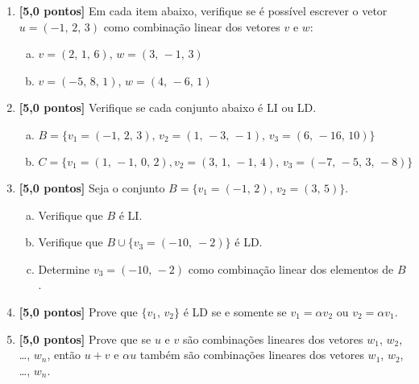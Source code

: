 \documentclass[12pt,a4paper]{article}
\begin{document}
\begin{enumerate}

  \item \textbf{[5,0 pontos]} Em cada item abaixo, verifique se é possível
  escrever o vetor $u = (-1,\, 2,\, 3)$ como combinação linear dos vetores 
  $v$ e $w$:
    \begin{enumerate}[(a)]
      \item $v = (2,\, 1,\, 6)$,  $w = (3,\, -1,\, 3)$
      \item $v = (-5,\, 8,\, 1)$, $w = (4,\, -6,\, 1)$
    \end{enumerate}
  
  \item \textbf{[5,0 pontos]} Verifique se cada conjunto abaixo é LI ou LD.
    \begin{enumerate}[(a)]
      \item $B = \{v_1 = (-1,\, 2,\, 3),\, v_2 = (1,\, -3,\, -1),\, v_3 = (6,\, -16,\, 10)\}$
      \item $C = \{v_1 = (1,\, -1,\, 0,\, 2), v_2 = (3,\, 1,\, -1,\, 4),\, v_3 = (-7,\, -5,\, 3,\, -8)\}$
    \end{enumerate}

  \item \textbf{[5,0 pontos]} Seja o conjunto $B = \{v_1 = (-1,\, 2),\, v_2 = (3,\, 5)\}$.
    \begin{enumerate}[(a)]
      \item Verifique que $B$ é LI.
      \item Verifique que $B\cup\{v_3 = (-10,\ -2)\}$ é LD.
      \item Determine $v_3 = (-10,\, -2)$ como combinação linear dos elementos de $B$.
    \end{enumerate}
    
  \item \textbf{[5,0 pontos]} Prove que $\{v_1,\,v_2\}$ é LD se e somente se
  $v_1 =\alpha v_2$ ou $v_2 =\alpha v_1$.
   
  \item \textbf{[5,0 pontos]} Prove que se $u$ e $v$ são combinações lineares 
  dos vetores $w_1$, $w_2$, \ldots, $w_n$, então $u + v$ e $\alpha u$ também 
  são combinações lineares dos vetores $w_1$, $w_2$, \ldots, $w_n$.
    
 
\end{enumerate}
\end{document}
